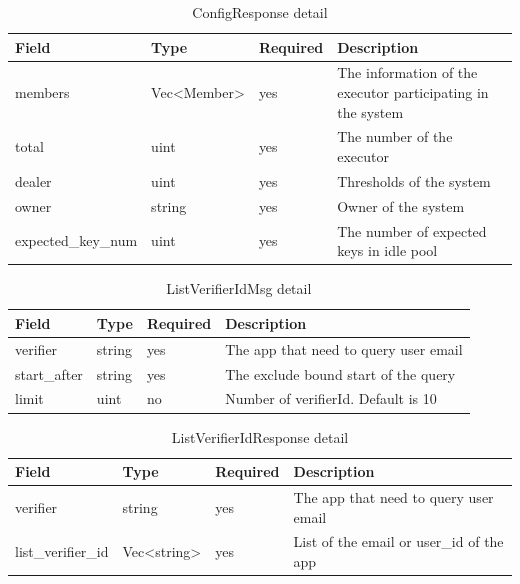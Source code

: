 \documentclass[../Main.tex]{subfiles}
\begin{document}
\begin{table}[H]
  \centering
  \begin{tabular}{|l|l|l|p{8cm}|}
\hline
\rowcolor[HTML]{F56B00}
\textbf{Field}     & \textbf{Type}                      & \textbf{Required} & \textbf{Description}                                        \\ \hline
members            & Vec\textless{}Member\textgreater{} & yes               & The information of the executor participating in the system \\ \hline
total              & uint                               & yes               & The number of the executor                                  \\ \hline
dealer             & uint                               & yes               & Thresholds of the system                                    \\ \hline
owner              & string                             & yes               & Owner of the system                                         \\ \hline
expected\_key\_num & uint                               & yes               & The number of expected keys in idle pool                    \\ \hline
\end{tabular}
  \caption{ConfigResponse detail}
  \label{config-response-detail}
\end{table}

\begin{table}[H]
  \centering
  \begin{tabular}{|l|l|l|p{8cm}|}
\hline
\rowcolor[HTML]{F56B00} 
\textbf{Field} & \textbf{Type} & \textbf{Required} & \textbf{Description}                  \\ \hline
verifier       & string       & yes               & The app that need to query user email \\ \hline
start\_after   & string        & yes               & The exclude bound start of the query  \\ \hline
limit          & uint          & no                & Number of verifierId. Default is 10   \\ \hline
\end{tabular}
  \caption{ListVerifierIdMsg detail}
  \label{listverifierid-msg-detail}
\end{table}

\begin{table}[H]
  \centering
  \begin{tabular}{|l|l|l|p{8cm}|}
\hline
\rowcolor[HTML]{F56B00} 
\textbf{Field}     & \textbf{Type}                      & \textbf{Required} & \textbf{Description}                     \\ \hline
verifier           & string                             & yes               & The app that need to query user email    \\ \hline
list\_verifier\_id & Vec\textless{}string\textgreater{} & yes               & List of the email or user\_id of the app \\ \hline
\end{tabular}
  \caption{ListVerifierIdResponse detail}
  \label{listverifierid-response-detail}
\end{table}
\end{document}
